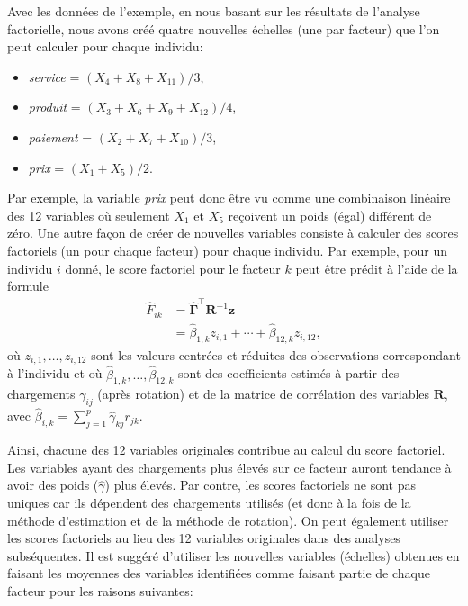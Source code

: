 \documentclass[
  11pt,
  letterpaper,
]{book}
\providecommand{\tightlist}{%
  \setlength{\itemsep}{0pt}\setlength{\parskip}{0pt}}
\theoremstyle{definition}
\theoremstyle{definition}
\theoremstyle{definition}
\theoremstyle{definition}
\theoremstyle{remark}
\begin{document}
Avec les données de l'exemple, en nous basant sur les résultats de l'analyse factorielle, nous avons créé quatre nouvelles échelles (une par facteur) que l'on peut calculer pour chaque individu:

\begin{itemize}
\tightlist
\item
  \emph{service} = \((X_4+X_8+X_{11})/3\),
\item
  \emph{produit} = \((X_3+X_6+X_9+X_{12})/4\),
\item
  \emph{paiement} = \((X_2+X_7+X_{10})/3\),
\item
  \emph{prix} = \((X_1+X_5)/2\).
\end{itemize}

Par exemple, la variable \emph{prix} peut donc être vu comme une combinaison linéaire des 12
variables où seulement \(X_1\) et \(X_5\) reçoivent un poids (égal) différent de zéro. Une autre façon de créer de nouvelles variables consiste à calculer des scores factoriels (un pour chaque facteur) pour chaque individu. Par exemple, pour un individu \(i\) donné, le score factoriel pour le facteur \(k\) peut être prédit à l'aide de la formule
\begin{align*}
\hat{F}_{ik} &= \widehat{\boldsymbol{\Gamma}}^{\top}\mathbf{R}^{-1}\boldsymbol{z}\\&=
\widehat{\beta}_{1, k} z_{i, 1} + \cdots + \widehat{\beta}_{12, k}z_{i, 12}, 
\end{align*}
où \(z_{i, 1}, \ldots, z_{i, 12}\) sont les valeurs centrées et réduites des observations correspondant à l'individu et où \(\widehat{\beta}_{1, k}, \ldots, \widehat{\beta}_{12, k}\) sont des coefficients estimés à partir des chargements \(\gamma_{ij}\) (après rotation) et de la matrice de corrélation des variables \(\mathbf{R}\), avec \(\widehat{\beta}_{i, k}=\sum_{j=1}^p \widehat{\gamma}_{kj}r_{jk}\).

Ainsi, chacune des 12 variables originales contribue au calcul du score
factoriel. Les variables ayant des chargements plus élevés sur ce facteur auront tendance à avoir des poids (\(\widehat{\gamma}\)) plus élevés. Par contre, les scores factoriels ne sont pas uniques car ils dépendent des chargements utilisés (et donc à la fois de la méthode d'estimation et de la méthode de rotation).
On peut également utiliser les scores factoriels au lieu des 12 variables
originales dans des analyses subséquentes. Il est suggéré d'utiliser les nouvelles variables (échelles) obtenues en faisant les moyennes des variables identifiées comme faisant partie de chaque facteur pour les raisons suivantes:
\end{document}
